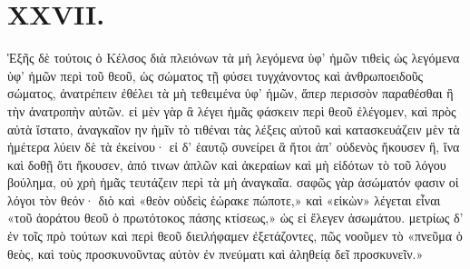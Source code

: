 \section*{XXVII.}

Ἑξῆς δὲ τούτοις ὁ Κέλσος διὰ πλειόνων τὰ μὴ λεγόμενα ὑφ' ἡμῶν τιθεὶς ὡς λεγόμενα ὑφ' ἡμῶν περὶ τοῦ θεοῦ, ὡς σώματος τῇ φύσει τυγχάνοντος καὶ ἀνθρωποειδοῦς σώματος, ἀνατρέπειν ἐθέλει τὰ μὴ τεθειμένα ὑφ' ἡμῶν, ἅπερ περισσὸν παραθέσθαι ἢ τὴν ἀνατροπὴν αὐτῶν. εἰ μὲν γὰρ ἃ λέγει ἡμᾶς φάσκειν περὶ θεοῦ ἐλέγομεν, καὶ πρὸς αὐτὰ ἵστατο, ἀναγκαῖον ην ἡμῖν τὸ τιθέναι τὰς λέξεις αὐτοῦ καὶ κατασκευάζειν μὲν τὰ ἡμέτερα λύειν δὲ τὰ ἐκείνου· εἰ δ' ἑαυτῷ συνείρει ἃ ἤτοι ἀπ' οὐδενὸς ἤκουσεν ἢ, ἵνα καὶ δοθῇ ὅτι ἤκουσεν, ἀπό τινων ἁπλῶν καὶ ἀκεραίων καὶ μὴ εἰδότων τὸ τοῦ λόγου βούλημα, οὐ χρὴ ἡμᾶς τευτάζειν περὶ τὰ μὴ ἀναγκαῖα. σαφῶς γὰρ ἀσώματόν φασιν οἱ λόγοι τὸν θεόν· διὸ καὶ «θεὸν οὐδεὶς ἑώρακε πώποτε,» καὶ «εἰκὼν» λέγεται εἶναι «τοῦ ἀοράτου θεοῦ ὁ πρωτότοκος πάσης κτίσεως,» ὡς εἰ ἔλεγεν ἀσωμάτου. μετρίως δ' ἐν τοῖς πρὸ τούτων καὶ περὶ θεοῦ διειλήφαμεν ἐξετάζοντες, πῶς νοοῦμεν τὸ «πνεῦμα ὁ θεὸς, καὶ τοὺς προσκυνοῦντας αὐτὸν ἐν πνεύματι καὶ ἀληθείᾳ δεῖ προσκυνεῖν.»